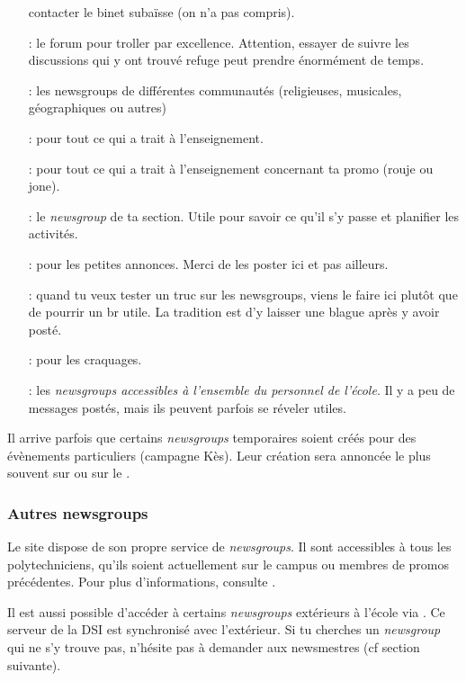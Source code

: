 \begin{itemize}
       contacter le binet subaïsse (on n'a pas compris).
 \item[\ngname{br.binet.polemix} :] le forum pour troller par excellence.
                           Attention, essayer de suivre les discussions qui y ont trouvé refuge
                           peut prendre énormément de temps.
 \item[\ngname{br.communauté.*} :] les newsgroups de différentes communautés
                            (religieuses, musicales, géographiques ou autres)
 \item[\ngname{br.enseignement} :] pour tout ce qui a trait à l'enseignement.
 \item[\ngname{br.enseignement.*} :] pour tout ce qui a trait à l'enseignement concernant ta promo (rouje ou jone).
 \item[\ngname{br.section.ta\_section\_sportive} :] le \emph{newsgroup} de ta section.
                                           Utile pour savoir ce qu'il s'y passe et planifier les activités.
 \item[\ngname{br.pa} :] pour les petites annonces. Merci de les poster ici et pas ailleurs.
 \item[\ngname{br.test} :] quand tu veux tester un truc sur les newsgroups,
                  viens le faire ici plutôt que de pourrir un br utile. La tradition est  d'y laisser une blague après y avoir posté.
 \item[\ngname{br.trash} :] pour les craquages.
 \item[\ngname{public.*} :] les \emph{newsgroups accessibles à l'ensemble du personnel de l'école}.
                   Il y a peu de messages postés, mais ils peuvent parfois se réveler utiles.
\end{itemize}

Il arrive parfois que certains \emph{newsgroups} temporaires soient créés pour des évènements particuliers (campagne Kès). Leur création sera annoncée
le plus souvent sur \fkz ou sur le .

\subsubsection{Autres newsgroups}
Le site  dispose de son propre service de \emph{newsgroups}. Il sont
accessibles à tous les polytechniciens, qu'ils soient actuellement sur le campus ou membres de
promos précédentes. Pour plus d'informations, consulte .

Il est aussi possible d'accéder à certains \emph{newsgroups} extérieurs à l'école via . Ce serveur de la DSI est synchronisé avec
l'extérieur. Si tu cherches un \emph{newsgroup} qui ne s'y trouve pas, n'hésite pas à demander aux newsmestres (cf section suivante).

